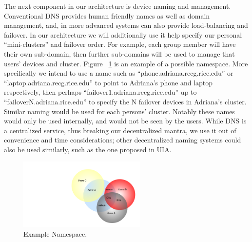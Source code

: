 The next component in our architecture is device naming and management.
Conventional DNS provides human friendly names as well as domain management, and, in more advanced systems can also provide load-balancing and failover.
In our architecture we will additionally use it help specify our personal "`mini-clusters"' and failover order.
For example, each group member will have their own sub-domain, then further sub-domains will be used to manage that users' devices and cluster.  Figure ~\ref{Fig.Venn} is an example of a possible namespace.
More specifically we intend to use a name such as "`phone.adriana.recg.rice.edu"' or "`laptop.adriana.recg.rice.edu"' to point to Adriana's phone and laptop respectively, then perhaps "`failover1.adriana.recg.rice.edu"' up to "`failoverN.adriana.rice.edu"' to specify the N failover devices in Adriana's cluster.
Similar naming would be used for each persons' cluster.
Notably these names would only be used internally, and would not be seen by the users.
While DNS is a centralized service, thus breaking our decentralized mantra, we use it out of convenience and time considerations; other decentralized naming systems could also be used similarly, such as the one proposed in UIA.

\begin{figure}[h]
	\begin{center}
	\includegraphics[width=2.5in]{venn.png}
	\caption{Example Namespace.}
	\label{Fig.Venn}
	\end{center}
\end{figure}


